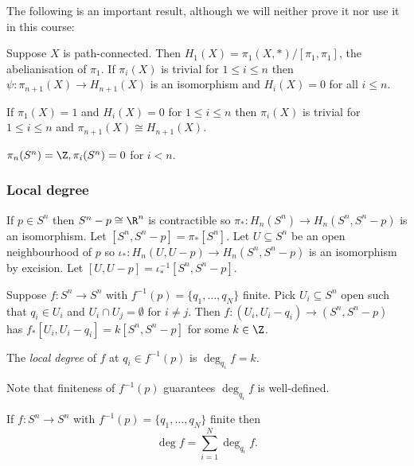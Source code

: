 \documentclass[a4paper]{article}
\begin{document}
The following is an important result, although we will neither prove it nor use it in this course:

\begin{theorem}[Hurewicz]
  Suppose \(X\) is path-connected. Then \(H_1(X) = \pi_1(X, *)/[\pi_1, \pi_1]\), the abelianisation of \(\pi_1\). If \(\pi_i(X)\) is trivial for \(1 \leq i \leq n\) then \(\psi: \pi_{n + 1}(X) \to H_{n + 1}(X)\) is an isomorphism and \(H_i(X) = 0\) for all \(i \leq n\).
\end{theorem}

\begin{corollary}
  If \(\pi_1(X) = 1\) and \(H_i(X) = 0\) for \(1 \leq i \leq n\) then \(\pi_i(X)\) is trivial for \(1 \leq i \leq n\) and \(\pi_{n + 1}(X) \cong H_{n + 1}(X)\).
\end{corollary}

\begin{corollary}
  \(\pi_n(S^n) = \Z, \pi_i(S^n) = 0\) for \(i < n\).
\end{corollary}

\subsubsection{Local degree}

If \(p \in S^n\) then \(S^n - p \cong \R^n\) is contractible so \(\pi_*: H_n(S^n) \to H_n(S^n, S^n - p)\) is an isomorphism. Let \([S^n, S^n - p] = \pi_*[S^n]\). Let \(U \subseteq S^n\) be an open neighbourhood of \(p\) so \(\iota_*: H_n(U, U - p) \to H_n(S^n, S^n - p)\) is an isomorphism by excision. Let \([U, U - p] = \iota_*^{-1}[S^n, S^n - p]\).

Suppose \(f: S^n \to S^n\) with \(f^{-1}(p) = \{q_1, \dots, q_N\}\) finite. Pick \(U_i \subseteq S^n\) open such that \(q_i \in U_i\) and \(U_i \cap U_j = \emptyset\) for \(i \neq j\). Then \(f: (U_i, U_i - q_i) \to (S^n, S^n - p)\) has \(f_*[U_i, U_i - q_i] = k[S^n, S^n - p]\) for some \(k \in \Z\).

\begin{definition}
  The \emph{local degree} of \(f\) at \(q_i \in f^{-1}(p)\) is \(\deg_{q_i} f = k\).
\end{definition}
Note that finiteness of \(f^{-1}(p)\) guarantees \(\deg_{q_i}f\) is well-defined.

\begin{theorem}
  If \(f: S^n \to S^n\) with \(f^{-1}(p) = \{q_1, \dots, q_N\}\) finite then
  \[
    \deg f = \sum_{i = 1}^N \deg_{q_i} f.
  \]
\end{theorem}
\end{document}

